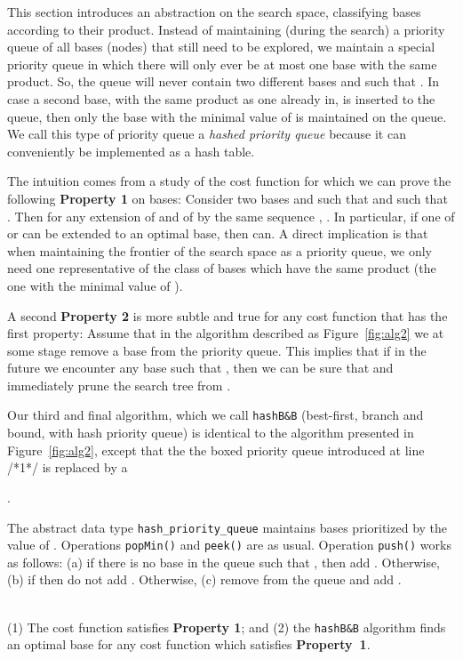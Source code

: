 \documentclass[envcountsame]{llncs}
\begin{document}
This section introduces an abstraction on the search space,
classifying bases according to their product. Instead of maintaining
(during the search) a priority queue of all bases
(nodes) that still need to be explored, we maintain a special priority
queue in which there will only ever be at most one base with the same
product.  So, the queue will never contain two
different
bases  and 
such that .
In case a second base, with the same product as one already in, is
inserted to the queue, then
only
the base with the minimal value of
 is maintained on the queue. We call this type of
priority queue a \emph{hashed priority queue} because it
can conveniently be
implemented as a hash table.

The intuition comes from a study of the  cost function for
which we can prove the following \textbf{Property 1} on bases:
Consider two bases  and  such that 
and such that . Then for
any extension of  and of  by the same sequence ,
.  In particular, if one of  or
 can be extended to an optimal base, then  can.
A direct implication is that when maintaining the frontier of the
search space as a priority queue, we only need one representative of
the class of bases which have the same product (the one with the
minimal value of ).

A second \textbf{Property 2} is more subtle and true for any cost
function that has the first property: Assume that in the algorithm
described as Figure~\ref{fig:alg2} we at some stage remove a base
 from the priority queue. This implies that if in the future we
encounter any base  such that , then we
can be sure that  and immediately
prune the search tree from .

Our third and final algorithm, which we call \texttt{hashB\&B}
(best-first, branch and bound, with hash priority queue) is identical
to the algorithm presented in Figure~\ref{fig:alg2}, except that the
the boxed priority queue introduced at line {\scriptsize /*1*/} is
replaced by a \begin{tt}\end{tt}.

The abstract data type \texttt{hash\_priority\_queue} maintains bases
prioritized by the value of . Operations
\texttt{popMin()} and \texttt{peek()} are as usual. Operation
\texttt{push()} works as follows: (a) if there is no base 
in the queue such that , then add .
Otherwise, (b) if  then
do not add . Otherwise, (c) remove  from the queue and add
.


\begin{theorem}\label{algIsGood}~\\
\noindent(1) The  cost function satisfies \textbf{Property 1}; and
(2)
the \texttt{hashB\&B} algorithm finds an optimal base for any cost
function which satisfies \textbf{Property~1}.
\end{theorem}
\end{document}
